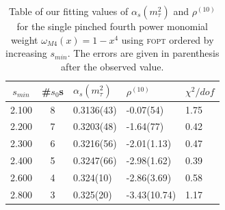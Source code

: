 \documentclass[../../index.tex]{subfiles}
\begin{document}
\begin{table}
  \centering
  \begin{tabularx}{\textwidth}{ccYYY}
    \toprule
    \(s_{min}\) & \#\(s_0\)s & \(\alpha_s(m_\tau^2)\) & \(\rho^{(10)}\) & \(\chi^2/dof\)  \\
    \midrule
    2.100 & 8  & 0.3136(43) & -0.07(54) & 1.75 \\
    2.200 & 7  & 0.3203(48) & -1.64(77) & 0.42 \\
    2.300 & 6  & 0.3216(56) & -2.01(1.13) & 0.47 \\
    2.400 & 5  & 0.3247(66) & -2.98(1.62) & 0.39 \\
    2.600 & 4  & 0.324(10) & -2.86(3.69) & 0.58 \\
    2.800 & 3  & 0.325(20) & -3.43(10.74) & 1.17 \\
    \bottomrule
  \end{tabularx}
  \caption{Table of our fitting values of \(\alpha_s(m_\tau^2)\) and
    \(\rho^{(10)}\) for the single pinched fourth power monomial weight
    \(\omega_{M4}(x)=1-x^4\) using \textsc{fopt} ordered by increasing
    \(s_{min}\). The errors are given in parenthesis after the observed value.}
  \label{table:fitWM4AlD10}
\end{table}
\end{document}
